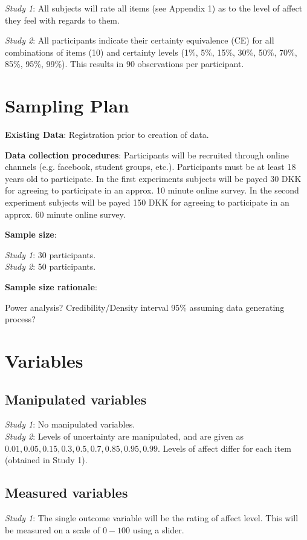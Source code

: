 \documentclass[12pt]{article}
\begin{document}
\emph{Study 1}: All subjects will rate all items
(see Appendix 1) as to the level of affect they
feel with regards to them.

\emph{Study 2}: All participants
indicate their certainty equivalence (CE) for all
combinations of items (10) and certainty levels
(1\%, 5\%, 15\%, 30\%, 50\%, 70\%, 85\%, 95\%, 99\%).
This results in $90$ observations per participant.

\section{Sampling Plan}

\textbf{Existing Data}: Registration prior
to creation of data.

\textbf{Data collection procedures}:
Participants will be recruited through online
channels (e.g. facebook, student groups, etc.).
Participants must be at least 18 years old to
participate. In the first experiments subjects
will be payed 30 DKK for agreeing to participate
in an approx. 10 minute online survey. In the
second experiment subjects will be payed 150 DKK
for agreeing to participate in an approx. 60 minute
online survey.

\textbf{Sample size}:

\emph{Study 1}: 30 participants. \\
\emph{Study 2}: 50 participants.

\textbf{Sample size rationale}:

Power analysis?
Credibility/Density interval 95\%
assuming data generating process?

\section{Variables}

\subsection{Manipulated variables}
\emph{Study 1}: No manipulated variables. \\

\emph{Study 2}: Levels of uncertainty are
manipulated, and are given as
$0.01, 0.05, 0.15, 0.3, 0.5, 0.7, 0.85, 0.95, 0.99$.
Levels of affect differ for each item
(obtained in Study 1).

\subsection{Measured variables}
\emph{Study 1}: The single outcome variable
will be the rating of affect level. This will
be measured on a scale of $0-100$ using a
slider.
\end{document}
